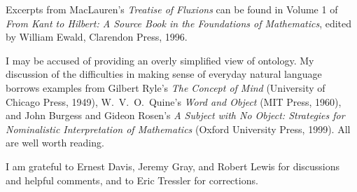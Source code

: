 \documentclass[12pt]{article}
\begin{document}
Excerpts from MacLauren's \emph{Treatise of Fluxions} can be found in Volume 1 of  \emph{From Kant to Hilbert: A Source Book in the Foundations of Mathematics}, edited by William Ewald, Clarendon Press, 1996.

I may be accused of providing an overly simplified view of ontology. My discussion of the difficulties in making sense of everyday natural language borrows examples from Gilbert Ryle's \emph{The Concept of Mind} (University of Chicago Press, 1949), W.~V.~O.~Quine's \emph{Word and Object} (MIT Press, 1960), and John Burgess and Gideon Rosen's \emph{A Subject with No Object: Strategies for Nominalistic Interpretation of Mathematics} (Oxford University Press, 1999). All are well worth reading.

I am grateful to Ernest Davis, Jeremy Gray, and Robert Lewis for discussions and helpful comments, and to Eric Tressler for corrections.
\end{document}
